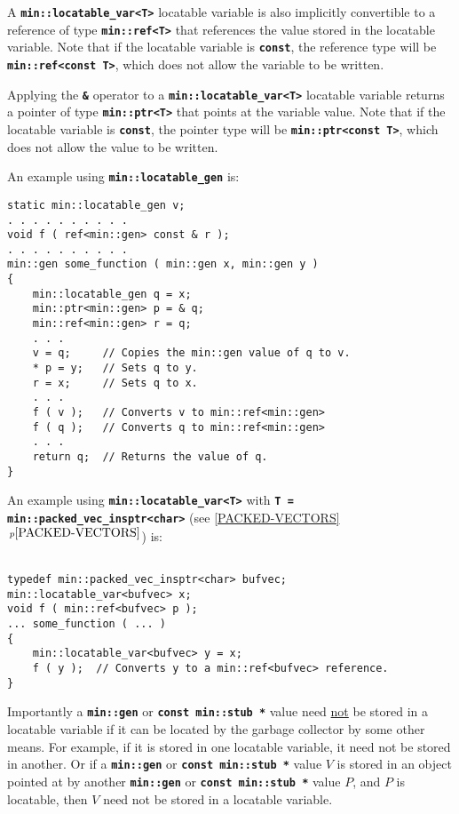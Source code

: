 \documentclass[12pt]{article}
\newcommand{\TT}[1]{{\tt \bfseries #1}}
\newcommand{\itemref}[1]{\ref{#1}$\,^{p\pageref{#1}}$}
\newcommand{\EOL}{\penalty \exhyphenpenalty}
\newenvironment{indpar}[1][0.3in]%
	{\begin{list}{}%
		     {\setlength{\itemsep}{0in}%
		      \setlength{\topsep}{0in}%
		      \setlength{\parsep}{1ex}%
		      \setlength{\labelwidth}{#1}%
		      \setlength{\leftmargin}{#1}%
		      \addtolength{\leftmargin}{\labelsep}}%
	 \item}%
	{\end{list}}
\begin{document}
A \TT{min::\EOL locatable\_\EOL var<T>} locatable variable
\label{LOCATABLE_VAR_REF}
is also implicitly convertible to a reference
of type \TT{min::\EOL ref<T>}
that references the value stored in the locatable variable.
Note that if the locatable variable is \TT{const}, the reference type
will be \TT{min::\EOL ref<const T>}, which does not allow
the variable to be written.

Applying the \TT{\&} operator to a
\label{LOCATABLE_VAR_PTR}
\TT{min::\EOL locatable\_\EOL var<T>} locatable variable
returns a pointer of type \TT{min::\EOL ptr<T>} that points
at the variable value.
Note that if the locatable variable is \TT{const}, the pointer type
will be \TT{min::\EOL ptr<const T>}, which does not allow
the value to be written.

An example using \TT{min::locatable\_gen} is:

\begin{indpar}\begin{verbatim}
static min::locatable_gen v;
. . . . . . . . . .
void f ( ref<min::gen> const & r );
. . . . . . . . . .
min::gen some_function ( min::gen x, min::gen y )
{
    min::locatable_gen q = x;
    min::ptr<min::gen> p = & q;
    min::ref<min::gen> r = q;
    . . .
    v = q;     // Copies the min::gen value of q to v.
    * p = y;   // Sets q to y.
    r = x;     // Sets q to x.
    . . .
    f ( v );   // Converts v to min::ref<min::gen>
    f ( q );   // Converts q to min::ref<min::gen>
    . . .
    return q;  // Returns the value of q.
}
\end{verbatim}\end{indpar}

An example using \TT{min::\EOL locatable\_\EOL var<T>} with
\TT{T = min::\EOL packed\_\EOL vec\_\EOL insptr<char>}
(see \itemref{PACKED-VECTORS}) is:

\begin{indpar}\begin{verbatim}

typedef min::packed_vec_insptr<char> bufvec;
min::locatable_var<bufvec> x;
void f ( min::ref<bufvec> p );
... some_function ( ... )
{
    min::locatable_var<bufvec> y = x;
    f ( y );  // Converts y to a min::ref<bufvec> reference.
}
\end{verbatim}\end{indpar}

Importantly a \TT{min::gen} or \TT{const min::stub *}
value need \underline{not} be stored
in a locatable variable if it can be located by the garbage collector by some
other means.  For example, if it is stored in one locatable variable,
it need not be stored in another.  Or if a \TT{min::gen}
or \TT{const min::\EOL stub~*} value
$V$ is stored in an object pointed at by another \TT{min::gen}
or \TT{const min::\EOL stub~*}
value $P$, and $P$ is locatable, then $V$ need not
be stored in a locatable variable.
\end{document}

